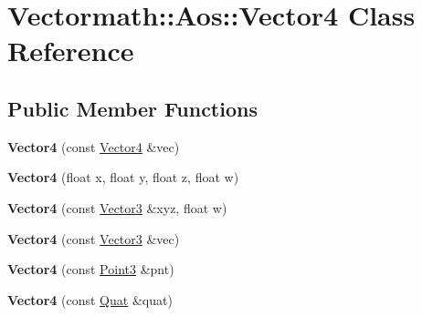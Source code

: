 \hypertarget{classVectormath_1_1Aos_1_1Vector4}{}\section{Vectormath\+:\+:Aos\+:\+:Vector4 Class Reference}
\label{classVectormath_1_1Aos_1_1Vector4}
\subsection*{Public Member Functions}
\begin{DoxyCompactItemize}
\item 
\mbox{\label{classVectormath_1_1Aos_1_1Vector4_ae1761e06fb715a8534084780ee52a438}} 
{\bfseries Vector4} (const \hyperlink{classVectormath_1_1Aos_1_1Vector4}{Vector4} \&vec)
\item 
\mbox{\label{classVectormath_1_1Aos_1_1Vector4_a3a4501d24f6f6c97af5ed98b457215e2}} 
{\bfseries Vector4} (float x, float y, float z, float w)
\item 
\mbox{\label{classVectormath_1_1Aos_1_1Vector4_aa01a20cca631ed841fa5e7dc054d3a3b}} 
{\bfseries Vector4} (const \hyperlink{classVectormath_1_1Aos_1_1Vector3}{Vector3} \&xyz, float w)
\item 
\mbox{\label{classVectormath_1_1Aos_1_1Vector4_a6294264878da234130bc0e7b932c5d6a}} 
{\bfseries Vector4} (const \hyperlink{classVectormath_1_1Aos_1_1Vector3}{Vector3} \&vec)
\item 
\mbox{\label{classVectormath_1_1Aos_1_1Vector4_aa9a6005bd217cc94abd52c1265ba6eff}} 
{\bfseries Vector4} (const \hyperlink{classVectormath_1_1Aos_1_1Point3}{Point3} \&pnt)
\item 
\mbox{\label{classVectormath_1_1Aos_1_1Vector4_a82a4a71383f2b05c053b00a4f13f9dda}} 
{\bfseries Vector4} (const \hyperlink{classVectormath_1_1Aos_1_1Quat}{Quat} \&quat)
\item 
\mbox{\label{classVectormath_1_1Aos_1_1Vector4_ab619fab419710166c719f7c2ff8d55f2}} 

\end{DoxyCompactItemize}
